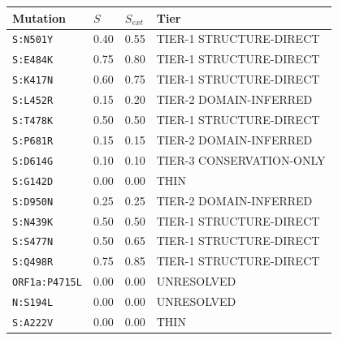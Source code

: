 \begin{longtable}{llll}\toprule Mutation & $S$ & $S_{ext}$ & Tier\\\midrule\endhead
\texttt{S:N501Y} & 0.40 & 0.55 & TIER-1 STRUCTURE-DIRECT\\
\texttt{S:E484K} & 0.75 & 0.80 & TIER-1 STRUCTURE-DIRECT\\
\texttt{S:K417N} & 0.60 & 0.75 & TIER-1 STRUCTURE-DIRECT\\
\texttt{S:L452R} & 0.15 & 0.20 & TIER-2 DOMAIN-INFERRED\\
\texttt{S:T478K} & 0.50 & 0.50 & TIER-1 STRUCTURE-DIRECT\\
\texttt{S:P681R} & 0.15 & 0.15 & TIER-2 DOMAIN-INFERRED\\
\texttt{S:D614G} & 0.10 & 0.10 & TIER-3 CONSERVATION-ONLY\\
\texttt{S:G142D} & 0.00 & 0.00 & THIN\\
\texttt{S:D950N} & 0.25 & 0.25 & TIER-2 DOMAIN-INFERRED\\
\texttt{S:N439K} & 0.50 & 0.50 & TIER-1 STRUCTURE-DIRECT\\
\texttt{S:S477N} & 0.50 & 0.65 & TIER-1 STRUCTURE-DIRECT\\
\texttt{S:Q498R} & 0.75 & 0.85 & TIER-1 STRUCTURE-DIRECT\\
\texttt{ORF1a:P4715L} & 0.00 & 0.00 & UNRESOLVED\\
\texttt{N:S194L} & 0.00 & 0.00 & UNRESOLVED\\
\texttt{S:A222V} & 0.00 & 0.00 & THIN\\
\bottomrule\end{longtable}
